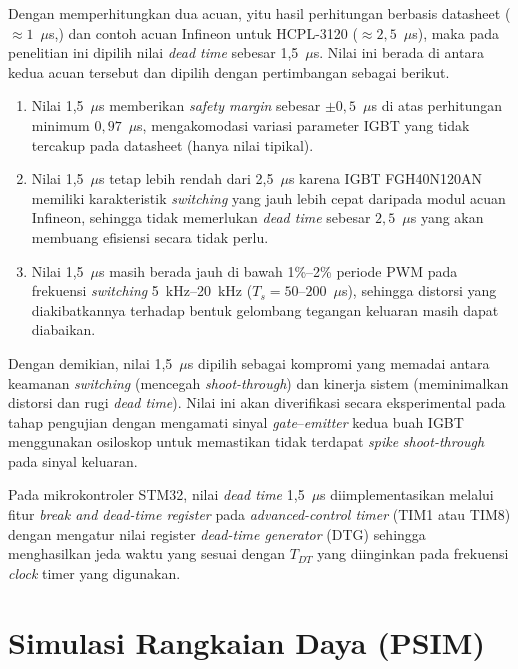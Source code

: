 Dengan memperhitungkan dua acuan, yitu hasil perhitungan berbasis
datasheet ($\approx 1$~$\mu$s,) dan contoh acuan Infineon untuk
HCPL-3120 ($\approx 2{,}5$~$\mu$s), maka pada penelitian ini
dipilih nilai \emph{dead time} sebesar 1{,}5~$\mu$s.
Nilai ini berada di antara kedua acuan tersebut dan dipilih
dengan pertimbangan sebagai berikut.
\begin{enumerate}
  \item Nilai 1{,}5~$\mu$s memberikan \emph{safety margin}
        sebesar $\pm 0{,}5$~$\mu$s di atas perhitungan minimum
        $0{,}97$~$\mu$s, mengakomodasi variasi parameter IGBT
        yang tidak tercakup pada datasheet (hanya nilai tipikal).
  \item Nilai 1{,}5~$\mu$s tetap lebih rendah dari 2{,}5~$\mu$s
        karena IGBT FGH40N120AN memiliki karakteristik
        \emph{switching} yang jauh lebih cepat daripada modul
        acuan Infineon, sehingga tidak memerlukan \emph{dead
        time} sebesar $2{,}5$~$\mu$s yang akan membuang efisiensi
        secara tidak perlu.
  \item Nilai 1{,}5~$\mu$s masih berada jauh di bawah 1\%--2\%
        periode PWM pada frekuensi \emph{switching} 5~kHz--20~kHz
        ($T_s = 50$--$200$~$\mu$s), sehingga distorsi yang
        diakibatkannya terhadap bentuk gelombang tegangan
        keluaran masih dapat diabaikan.
\end{enumerate}

Dengan demikian, nilai 1{,}5~$\mu$s dipilih sebagai
kompromi yang memadai antara keamanan \emph{switching}
(mencegah \emph{shoot-through}) dan kinerja sistem (meminimalkan
distorsi dan rugi \emph{dead time}). Nilai ini akan diverifikasi
secara eksperimental pada tahap pengujian dengan mengamati
sinyal \emph{gate}--\emph{emitter} kedua buah IGBT
menggunakan osiloskop untuk memastikan tidak terdapat
\emph{spike} \emph{shoot-through} pada sinyal keluaran.

Pada mikrokontroler STM32, nilai \emph{dead time} 1{,}5~$\mu$s
diimplementasikan melalui fitur \emph{break and dead-time
register} pada \emph{advanced-control timer} (TIM1 atau TIM8)
dengan mengatur nilai register \emph{dead-time generator}
(DTG) sehingga menghasilkan jeda waktu yang sesuai dengan
$T_{DT}$ yang diinginkan pada frekuensi \emph{clock} timer
yang digunakan.

\section{Simulasi Rangkaian Daya (PSIM)}
\label{sec:simulasi-psim}

